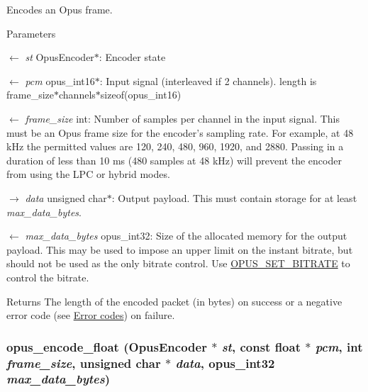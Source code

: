 Encodes an Opus frame. 
\begin{DoxyParams}{Parameters}
\item[\mbox{$\leftarrow$} {\em st}]{\ttfamily OpusEncoder$\ast$}: Encoder state \item[\mbox{$\leftarrow$} {\em pcm}]{\ttfamily opus\_\-int16$\ast$}: Input signal (interleaved if 2 channels). length is frame\_\-size$\ast$channels$\ast$sizeof(opus\_\-int16) \item[\mbox{$\leftarrow$} {\em frame\_\-size}]{\ttfamily int}: Number of samples per channel in the input signal. This must be an Opus frame size for the encoder's sampling rate. For example, at 48 kHz the permitted values are 120, 240, 480, 960, 1920, and 2880. Passing in a duration of less than 10 ms (480 samples at 48 kHz) will prevent the encoder from using the LPC or hybrid modes. \item[\mbox{$\rightarrow$} {\em data}]{\ttfamily unsigned char$\ast$}: Output payload. This must contain storage for at least {\itshape max\_\-data\_\-bytes\/}. \item[\mbox{$\leftarrow$} {\em max\_\-data\_\-bytes}]{\ttfamily opus\_\-int32}: Size of the allocated memory for the output payload. This may be used to impose an upper limit on the instant bitrate, but should not be used as the only bitrate control. Use \hyperlink{group__opus__encoderctls_ga0bb51947e355b33d0cb358463b5101a7}{OPUS\_\-SET\_\-BITRATE} to control the bitrate. \end{DoxyParams}
\begin{DoxyReturn}{Returns}
The length of the encoded packet (in bytes) on success or a negative error code (see \hyperlink{group__opus__errorcodes}{Error codes}) on failure. 
\end{DoxyReturn}
\hypertarget{group__opus__encoder_ga4ae9905859cd241ef4bb5c59cd5e5309}{
\subsubsection[{opus\_\-encode\_\-float}]{ opus\_\-encode\_\-float ({\bf OpusEncoder} $\ast$ {\em st}, \/  const float $\ast$ {\em pcm}, \/  int {\em frame\_\-size}, \/  unsigned char $\ast$ {\em data}, \/  {\bf opus\_\-int32} {\em max\_\-data\_\-bytes})}}
\label{group__opus__encoder_ga4ae9905859cd241ef4bb5c59cd5e5309}



